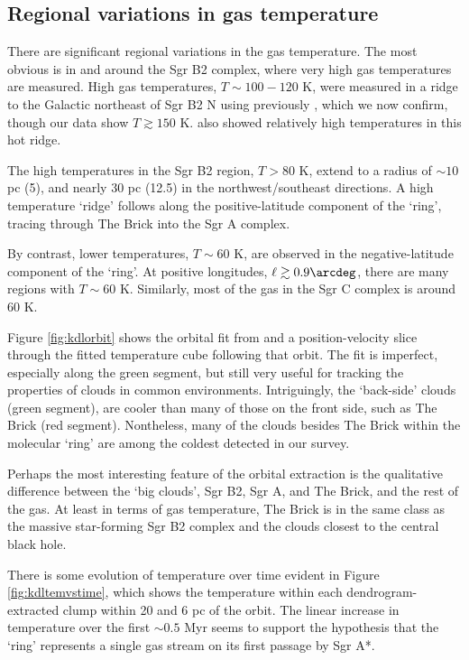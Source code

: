 \subsection{Regional variations in gas temperature}
There are significant regional variations in the gas temperature.  The most
obvious is in and around the Sgr B2 complex, where very high gas temperatures
are measured.  High gas temperatures, $T\sim100-120$ K, were measured in a ridge to the
Galactic northeast of Sgr B2 N using \methylcyanide previously \citep[][Figure
4b]{de-Vicente1997a}, which we now confirm, though our data show $T\gtrsim150$ K.
\citet{Ott2014a} also showed relatively high \ammonia temperatures in this hot
ridge.

The high temperatures in the Sgr B2 region, $T>80$ K, extend to a radius of
$\sim10$ pc (5\arcmin), and nearly 30 pc (12.5\arcmin) in the
northwest/southeast directions.  A high temperature `ridge' follows along the
positive-latitude component of the \citet{Molinari2011a} `ring', tracing
through The Brick into the Sgr A complex.

By contrast, lower temperatures, $T\sim60$ K, are observed in the
negative-latitude component of the `ring'.  At positive longitudes,
$\ell\gtrsim0.9\arcdeg$, there are many regions with $T\sim60$ K.  Similarly,
most of the gas in the Sgr C complex is around 60 K.

Figure \ref{fig:kdlorbit} shows the orbital fit from \citet{Kruijssen2014d} and
a position-velocity slice through the fitted temperature cube following that
orbit.  The fit is imperfect, especially along the green segment, but still very useful
for tracking the properties of clouds in common environments.
Intriguingly, the `back-side' clouds (green segment), are cooler than
many of those on the front side, such as The Brick (red segment).  Nontheless,
many of the clouds besides The Brick within the molecular `ring' are among the
coldest detected in our survey.

Perhaps the most interesting feature of the orbital extraction is the qualitative
difference between the `big clouds', Sgr B2, Sgr A, and The Brick, and the rest
of the gas.  At least in terms of gas temperature, The Brick is in the same class
as the massive star-forming Sgr B2 complex and the clouds closest to the central
black hole.

There is some evolution of temperature over time evident in Figure
\ref{fig:kdltemvstime}, which shows the temperature within each
dendrogram-extracted clump within 20 \kms and 6 pc of the
\citet{Kruijssen2014d} orbit.  The linear increase in temperature over the
first $\sim0.5$ Myr seems to support the \citet{Kruijssen2014d} hypothesis that
the `ring' represents a single gas stream on its first passage by Sgr A*.

